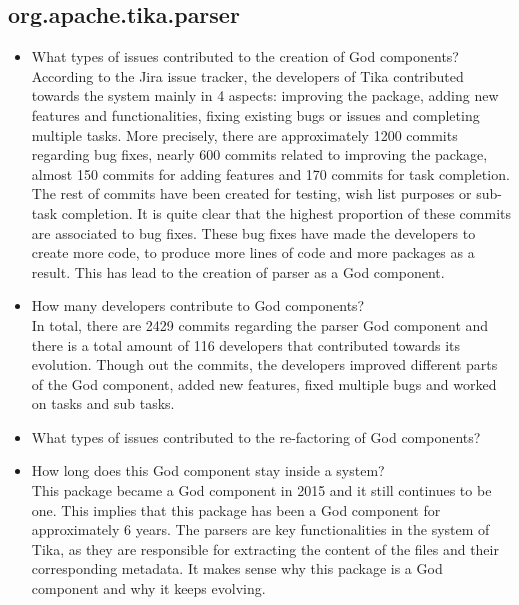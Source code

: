 \documentclass{article}
\begin{document}
\subsection{org.apache.tika.parser}
\begin{itemize}
    \item What types of issues contributed to the creation of God components? \\
    According to the Jira issue tracker, the developers of Tika contributed towards the system mainly in 4 aspects: improving the package, adding new features and functionalities, fixing existing bugs or issues and completing multiple tasks. More precisely, there are approximately 1200 commits regarding bug fixes, nearly 600 commits related to improving the package, almost 150 commits for adding features and 170 commits for task completion. The rest of commits have been created for testing, wish list purposes or sub-task completion. It is quite clear that the highest proportion of these commits are associated to bug fixes. These bug fixes have made the developers to create more code, to produce more lines of code and more packages as a result. This has lead to the creation of parser as a God component. 
    \item How many developers contribute to God components?\\ In total, there are 2429 commits regarding the parser God component and there is a total amount of 116 developers that contributed towards its evolution. Though out the commits, the developers improved different parts of the God component, added new features, fixed multiple bugs and worked on tasks and sub tasks.  
     \item What types of issues contributed to the re-factoring of God components?\\
    \item How long does this God component stay inside a system?\\ This package became a God component in 2015 and it still continues to be one. This implies that this package has been a God component for approximately 6 years. The parsers are key functionalities in the system of Tika, as they are responsible for extracting the content of the files and their corresponding metadata. It makes sense why this package is a God component and why it keeps evolving.

\end{itemize}
\end{document}
